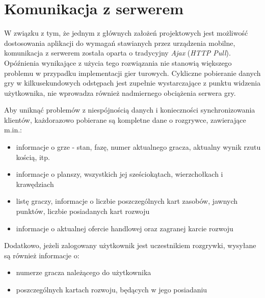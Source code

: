 \documentclass[11pt,twoside]{report}
\begin{document}
\section{Komunikacja z serwerem}

W związku z tym, że jednym z głównych założeń projektowych jest
możliwość dostosowania aplikacji do wymagań stawianych przez
urządzenia mobilne, komunikacja z serwerem została oparta o tradycyjny
\emph{Ajax} (\emph{HTTP Pull}). Opóźnienia wynikające z użycia tego
rozwiązania nie stanowią większego problemu w przypadku implementacji
gier turowych. Cykliczne pobieranie danych gry w kilkusekundowych
odstępach jest zupełnie wystarczające z punktu widzenia użytkownika,
nie wprowadza również nadmiernego obciążenia serwera gry.

Aby uniknąć problemów z niespójnością danych i konieczności
synchronizowania klientów, każdorazowo pobierane są kompletne dane o
rozgrywce, zawierające m.in.:

\begin{itemize}
\item informacje o grze - stan, fazę, numer aktualnego gracza,
  aktualny wynik rzutu kością, itp.
\item informacje o planszy, wszystkich jej sześciokątach,
  wierzchołkach i krawędziach
\item listę graczy, informacje o liczbie poszczególnych kart zasobów,
  jawnych punktów, liczbie posiadanych kart rozwoju
\item informacje o aktualnej ofercie handlowej oraz zagranej karcie
  rozwoju
\end{itemize}

Dodatkowo, jeżeli zalogowany użytkownik jest uczestnikiem rozgrywki,
wysyłane są również informacje o:

\begin{itemize}
\item numerze gracza należącego do użytkownika
\item poszczególnych kartach rozwoju, będących w jego posiadaniu
\end{itemize}
\end{document}

